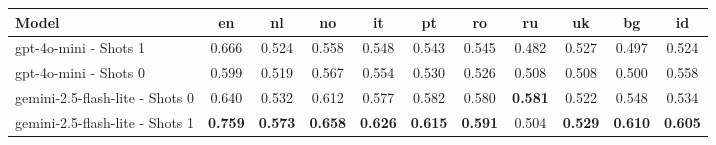 
\begin{tabular}{lcccccccccc}
\hline
Model & en & nl & no & it & pt & ro & ru & uk & bg & id \\
\hline
gpt-4o-mini - Shots 1 & 0.666 & 0.524 & 0.558 & 0.548 & 0.543 & 0.545 & 0.482 & 0.527 & 0.497 & 0.524 \\
gpt-4o-mini - Shots 0 & 0.599 & 0.519 & 0.567 & 0.554 & 0.530 & 0.526 & 0.508 & 0.508 & 0.500 & 0.558 \\
gemini-2.5-flash-lite - Shots 0 & 0.640 & 0.532 & 0.612 & 0.577 & 0.582 & 0.580 & \textbf{0.581} & 0.522 & 0.548 & 0.534 \\
gemini-2.5-flash-lite - Shots 1 & \textbf{0.759} & \textbf{0.573} & \textbf{0.658} & \textbf{0.626} & \textbf{0.615} & \textbf{0.591} & 0.504 & \textbf{0.529} & \textbf{0.610} & \textbf{0.605} \\
\hline
\end{tabular}
